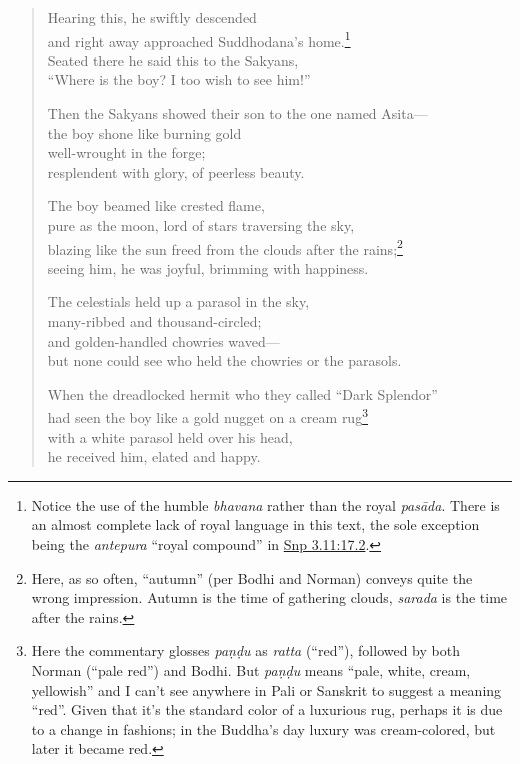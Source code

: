 \documentclass[12pt,openany]{book}%
\begin{document}
\begin{verse}
Hearing this, he swiftly descended \\
and right away approached Suddhodana’s home.\footnote{Notice the use of the humble \textit{bhavana} rather than the royal \textit{\textsanskrit{pasāda}}. There is an almost complete lack of royal language in this text, the sole exception being the \textit{antepura} “royal compound” in \href{https://suttacentral.net/snp3.11/en/sujato\#17.2}{Snp 3.11:17.2}. } \\
Seated there he said this to the Sakyans, \\
“Where is the boy? I too wish to see him!” 

Then the Sakyans showed their son to the one named Asita—\\
the boy shone like burning gold \\
well-wrought in the forge; \\
resplendent with glory, of peerless beauty. 

The boy beamed like crested flame, \\
pure as the moon, lord of stars traversing the sky, \\
blazing like the sun freed from the clouds after the rains;\footnote{Here, as so often, “autumn” (per Bodhi and Norman) conveys quite the wrong impression. Autumn is the time of gathering clouds, \textit{sarada} is the time after the rains. } \\
seeing him, he was joyful, brimming with happiness. 

The celestials held up a parasol in the sky, \\
many-ribbed and thousand-circled; \\
and golden-handled chowries waved—\\
but none could see who held the chowries or the parasols. 

When the dreadlocked hermit who they called “Dark Splendor” \\
had seen the boy like a gold nugget on a cream rug\footnote{Here the commentary glosses \textit{\textsanskrit{paṇḍu}} as \textit{ratta} (“red”), followed by both Norman (“pale red”) and Bodhi. But \textit{\textsanskrit{paṇḍu}} means “pale, white, cream, yellowish” and I can’t see anywhere in Pali or Sanskrit to suggest a meaning “red”. Given that it’s the standard color of a luxurious rug, perhaps it is due to a change in fashions; in the Buddha’s day luxury was cream-colored, but later it became red. } \\
with a white parasol held over his head, \\
he received him, elated and happy. 


\end{verse}
\end{document}
